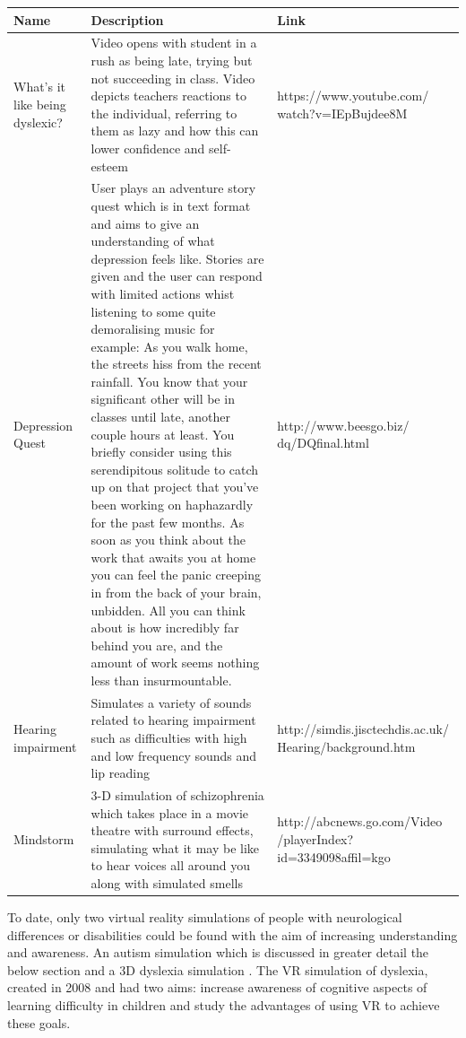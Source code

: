 \begin{table}
    \begin{tabular}{| p{2cm} | p{9cm} | p{5cm} |}
    \hline
    Name & Description & Link                                                                                                                                                                                   \\
    \hline
    \hline
  	What's it like being dyslexic? &  Video opens with student in a rush as being late, trying but not succeeding in class. Video depicts teachers reactions to the individual, referring to them as lazy and how this can lower confidence and self-esteem & https://www.youtube.com/ watch?v=IEpBujdee8M \\ \hline
  	Depression Quest  & User plays an adventure story quest which is in text format and aims to give an understanding of what depression feels like. Stories are given and the user can respond with limited actions whist listening to some quite demoralising music for example: As you walk home, the streets hiss from the recent rainfall. You know that your significant other will be in classes until late, another couple hours at least. You briefly consider using this serendipitous solitude to catch up on that project that you've been working on haphazardly for the past few months. As soon as you think about the work that awaits you at home you can feel the panic creeping in from the back of your brain, unbidden. All you can think about is how incredibly far behind you are, and the amount of work seems nothing less than insurmountable. & http://www.beesgo.biz/ dq/DQfinal.html \\ \hline
  	Hearing impairment & Simulates a variety of sounds related to hearing impairment such as difficulties with high and low frequency sounds and lip reading & http://simdis.jisctechdis.ac.uk/ Hearing/background.htm\\ \hline
Mindstorm & 3-D simulation of schizophrenia which takes place in a movie theatre with surround effects, simulating what it may be like to hear voices all around you along with simulated smells & http://abcnews.go.com/Video /playerIndex?id=3349098affil=kgo \\ \hline
    \end{tabular}
\end{table}

To date, only two virtual reality simulations of people with neurological differences or disabilities could be found with the aim of increasing understanding and awareness. An autism simulation which is discussed in greater detail the below section and a 3D dyslexia simulation \cite{dyslexicsimpar}. The VR simulation of dyslexia, created in 2008 and had two aims: increase awareness of cognitive aspects of learning difficulty in children and study the advantages of using VR to achieve these goals. 

